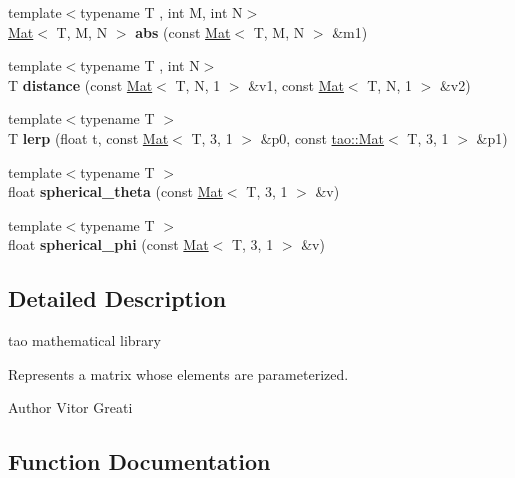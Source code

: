\begin{DoxyCompactItemize}
{\footnotesize template$<$typename T , int M, int N$>$ }\\\mbox{\hyperlink{classtao_1_1_mat}{Mat}}$<$ T, M, N $>$ {\bfseries abs} (const \mbox{\hyperlink{classtao_1_1_mat}{Mat}}$<$ T, M, N $>$ \&m1)
\item 
\mbox{\label{namespacetao_a0ad55693b5e325746cef811d68233127}} 
{\footnotesize template$<$typename T , int N$>$ }\\T {\bfseries distance} (const \mbox{\hyperlink{classtao_1_1_mat}{Mat}}$<$ T, N, 1 $>$ \&v1, const \mbox{\hyperlink{classtao_1_1_mat}{Mat}}$<$ T, N, 1 $>$ \&v2)
\item 
\mbox{\label{namespacetao_ad4eedb2744fdd348fd6ecf77c9c0761b}} 
{\footnotesize template$<$typename T $>$ }\\T {\bfseries lerp} (float t, const \mbox{\hyperlink{classtao_1_1_mat}{Mat}}$<$ T, 3, 1 $>$ \&p0, const \mbox{\hyperlink{classtao_1_1_mat}{tao\+::\+Mat}}$<$ T, 3, 1 $>$ \&p1)
\item 
\mbox{\label{namespacetao_ae3f87c76e9bcd4ae8fd729faa7dcf690}} 
{\footnotesize template$<$typename T $>$ }\\float {\bfseries spherical\+\_\+theta} (const \mbox{\hyperlink{classtao_1_1_mat}{Mat}}$<$ T, 3, 1 $>$ \&v)
\item 
\mbox{\label{namespacetao_af2ab01c4395f0f0627dda092fde39dde}} 
{\footnotesize template$<$typename T $>$ }\\float {\bfseries spherical\+\_\+phi} (const \mbox{\hyperlink{classtao_1_1_mat}{Mat}}$<$ T, 3, 1 $>$ \&v)
\end{DoxyCompactItemize}


\subsection{Detailed Description}
tao mathematical library 

Represents a matrix whose elements are parameterized.

\begin{DoxyAuthor}{Author}
Vitor Greati 
\end{DoxyAuthor}


\subsection{Function Documentation}
\mbox{\label{namespacetao_a0d5250c98322b01437ae6be0d9bd478d}} 
